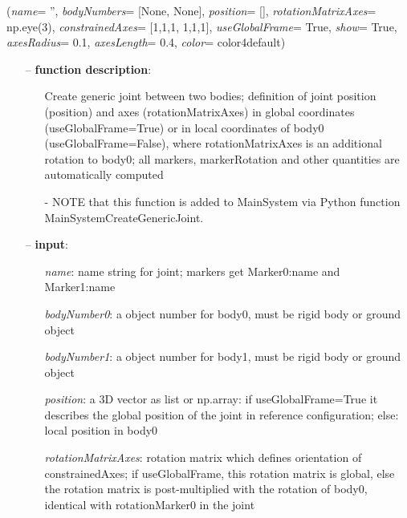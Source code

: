 %
\begin{flushleft}
\label{sec:mainsystemextensions:CreateGenericJoint}
({\it name}= '', {\it bodyNumbers}= [None, None], {\it position}= [], {\it rotationMatrixAxes}= np.eye(3), {\it constrainedAxes}= [1,1,1, 1,1,1], {\it useGlobalFrame}= True, {\it show}= True, {\it axesRadius}= 0.1, {\it axesLength}= 0.4, {\it color}= color4default)
\end{flushleft}
\setlength{\itemindent}{0.7cm}
\begin{itemize}[leftmargin=0.7cm]
\item[--]
{\bf function description}: \vspace{-6pt}
\begin{itemize}[leftmargin=1.2cm]
\setlength{\itemindent}{-0.7cm}
\item[]Create generic joint between two bodies; definition of joint position (position) and axes (rotationMatrixAxes) in global coordinates (useGlobalFrame=True) or in local coordinates of body0 (useGlobalFrame=False), where rotationMatrixAxes is an additional rotation to body0; all markers, markerRotation and other quantities are automatically computed
\item[]- NOTE that this function is added to MainSystem via Python function MainSystemCreateGenericJoint.
\end{itemize}
\item[--]
{\bf input}: \vspace{-6pt}
\begin{itemize}[leftmargin=1.2cm]
\setlength{\itemindent}{-0.7cm}
\item[]{\it name}: name string for joint; markers get Marker0:name and Marker1:name
\item[]{\it bodyNumber0}: a object number for body0, must be rigid body or ground object
\item[]{\it bodyNumber1}: a object number for body1, must be rigid body or ground object
\item[]{\it position}: a 3D vector as list or np.array: if useGlobalFrame=True it describes the global position of the joint in reference configuration; else: local position in body0
\item[]{\it rotationMatrixAxes}: rotation matrix which defines orientation of constrainedAxes; if useGlobalFrame, this rotation matrix is global, else the rotation matrix is post-multiplied with the rotation of body0, identical with rotationMarker0 in the joint

\end{itemize}
\end{itemize}
